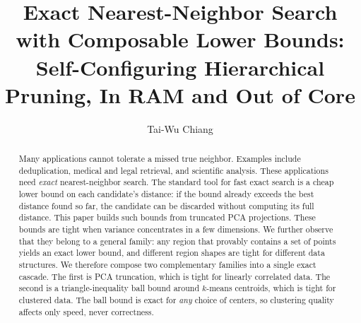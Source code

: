 \documentclass[sigconf, nonacm]{acmart}
\begin{document}
\title{Exact Nearest-Neighbor Search with Composable Lower Bounds:
Self-Configuring Hierarchical Pruning, In RAM and Out of Core}

\author{Tai-Wu Chiang}

\begin{abstract}
Many applications cannot tolerate a missed true neighbor. Examples include
deduplication, medical and legal retrieval, and scientific analysis. These
applications need \emph{exact} nearest-neighbor search. The standard tool
for fast exact search is a cheap lower bound on each candidate's distance:
if the bound already exceeds the best distance found so far, the candidate
can be discarded without computing its full distance. This paper builds
such bounds from truncated PCA projections. These bounds are tight when
variance concentrates in a few dimensions. We further observe that they
belong to a general family: any region that provably contains a set of
points yields an exact lower bound, and different region shapes are tight
for different data structures. We therefore compose two complementary
families into a single exact cascade. The first is PCA truncation, which
is tight for linearly correlated data. The second is a triangle-inequality
ball bound around $k$-means centroids, which is tight for clustered data.
The ball bound is exact for \emph{any} choice of centers, so clustering
quality affects only speed, never correctness.


\end{abstract}
\end{document}
